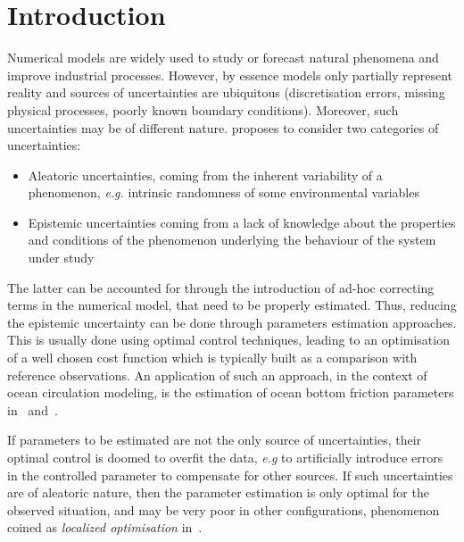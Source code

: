 \documentclass[../../Main_ManuscritThese.tex]{subfiles}
\begin{document}
\chapter*{Introduction}
\TitleBtwLines

{}
\label{chap:Introduction}
\pagestyle{introStyle}




Numerical models are widely used to study or forecast natural
phenomena and improve industrial processes. However, by essence models
only partially represent reality and sources of uncertainties are
ubiquitous (discretisation errors, missing physical processes, poorly
known boundary conditions).  Moreover, such uncertainties may be of
different nature. \cite{walker_defining_2003} proposes to consider two
categories of uncertainties:
\begin{itemize}
\item Aleatoric uncertainties, coming from the inherent variability of
a phenomenon, \emph{e.g.} intrinsic randomness of some environmental
variables
\item Epistemic uncertainties coming from a lack of knowledge about
the properties and conditions of the phenomenon underlying the
behaviour of the system under study
\end{itemize} The latter can be accounted for through the introduction
of ad-hoc correcting terms in the numerical model, that need to be
properly estimated. Thus, reducing the epistemic uncertainty can be
done through parameters estimation approaches. This is usually done
using optimal control techniques, leading to an optimisation of a well
chosen cost function which is typically built as a comparison with
reference observations.
  An application of such an approach, in the context of ocean
circulation modeling, is the estimation of ocean bottom friction
parameters in~\cite{das_estimation_1991}
and~\cite{boutet_estimation_2015}.

  If parameters to be estimated are not the only source of
uncertainties, their optimal control is doomed to overfit the data,
\emph{e.g} to artificially introduce errors in the controlled
parameter to compensate for other sources. If such uncertainties are
of aleatoric nature, then the parameter estimation is only optimal for
the observed situation, and may be very poor in other configurations,
phenomenon coined as \textit{localized optimisation}
in~\cite{huyse_free-form_2001}.
  
\end{document}
